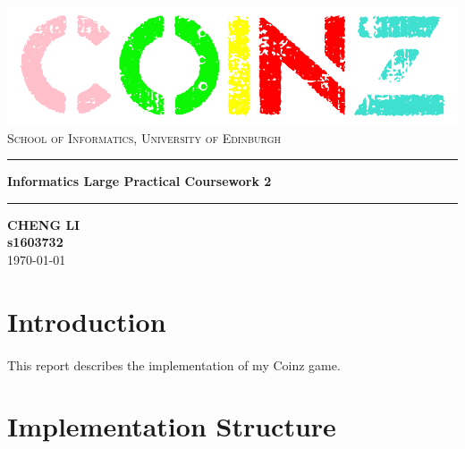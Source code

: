 \documentclass[12pt]{article}
\begin{document}
%
%
\begin{titlepage}
	
	\centering
	\includegraphics[scale=0.3]{coinz.png}\\[2cm]
	
	\textsc{\large School of Informatics, University of Edinburgh}\\[0.3cm]
	
	\hrule height 0.05cm
	\vspace{1cm}
	{\huge \bfseries Informatics Large Practical Coursework 2}
	\vspace{1cm}
	\hrule height 0.05cm
	
	\vspace{2cm}
	{\Large \textbf{CHENG LI}}\\[0.5cm]
	{\Large \textbf{s1603732}}\\[2cm]
	
	{\Large \today}\\[2cm]
		
\end{titlepage}
%
%
\section{Introduction}
\paragraph{} This report describes the implementation of my Coinz game.
%
%
\section{Implementation Structure}
\end{document}
